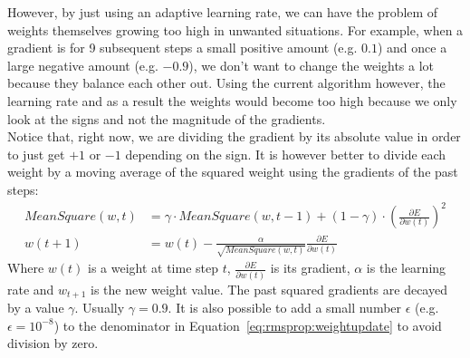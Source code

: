 However, by just using an adaptive learning rate, we can have the problem of weights themselves growing too high in unwanted situations. For example, when a gradient is for 9 subsequent steps a small positive amount (e.g. $0.1$) and once a large negative amount (e.g. $-0.9$), we don't want to change the weights a lot because they balance each other out.
Using the current algorithm however, the learning rate and as a result the weights would become too high because we only look at the signs and not the magnitude of the gradients.\\
Notice that, right now, we are dividing the gradient by its absolute value in order to just get $+1$ or $-1$ depending on the sign. It is however better to divide each weight by a moving average of the squared weight using the gradients of the past steps:
\begin{subequations}
\label{eq:rmsprop}
\begin{align}
MeanSquare(w, t) &= \gamma \cdot MeanSquare(w, t-1) + (1 - \gamma) \cdot \left (\frac{\partial E}{\partial w(t)} \right )^2 \\
w(t+1) &= w(t) - \frac{\alpha}{\sqrt{MeanSquare(w,t)}}\frac{\partial E}{\partial w(t)} \label{eq:rmsprop:weightupdate}
\end{align}
\end{subequations}
Where $w(t)$ is a weight at time step $t$, $\frac{\partial E}{\partial w(t)}$ is its gradient, $\alpha$ is the learning rate and $w_{t+1}$ is the new weight value. The past squared gradients are decayed by a value $\gamma$. Usually $\gamma=0.9$. It is also possible to add a small number $\epsilon$ (e.g. $\epsilon = 10^{-8}$) to the denominator in Equation~\ref{eq:rmsprop:weightupdate} to avoid division by zero.\\

